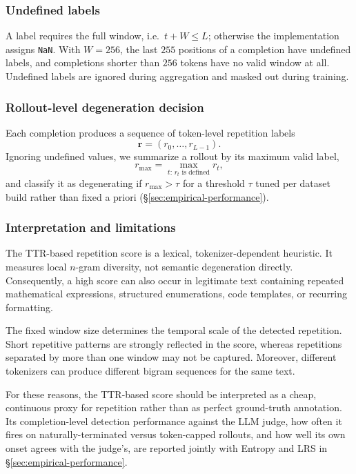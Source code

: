 \documentclass{article}
\begin{document}
\subsubsection{Undefined labels}

A label requires the full window, i.e.\ $t+W\leq L$; otherwise the
implementation assigns \texttt{NaN}. With $W=256$, the last $255$ positions
of a completion have undefined labels, and completions shorter than $256$
tokens have no valid window at all. Undefined labels are ignored during
aggregation and masked out during training.

\subsubsection{Rollout-level degeneration decision}

Each completion produces a sequence of token-level repetition labels
\[
\mathbf{r}=(r_0,\ldots,r_{L-1}).
\]
Ignoring undefined values, we summarize a rollout by its maximum valid
label,
\[
r_{\max} = \max_{t:\,r_t\text{ is defined}} r_t,
\]
and classify it as degenerating if $r_{\max}>\tau$ for a threshold $\tau$
tuned per dataset build rather than fixed a priori
(\S\ref{sec:empirical-performance}).

\subsubsection{Interpretation and limitations}

The TTR-based repetition score is a lexical, tokenizer-dependent heuristic.
It measures local \(n\)-gram diversity, not semantic degeneration directly.
Consequently, a high score can also occur in legitimate text containing
repeated mathematical expressions, structured enumerations, code templates,
or recurring formatting.

The fixed window size determines the temporal scale of the detected
repetition. Short repetitive patterns are strongly reflected in the score,
whereas repetitions separated by more than one window may not be captured.
Moreover, different tokenizers can produce different bigram sequences for the
same text.

For these reasons, the TTR-based score should be interpreted as a cheap,
continuous proxy for repetition rather than as perfect ground-truth
annotation. Its completion-level detection performance against the LLM
judge, how often it fires on naturally-terminated versus token-capped
rollouts, and how well its own onset agrees with the judge's, are reported
jointly with Entropy and LRS in \S\ref{sec:empirical-performance}.
\end{document}
